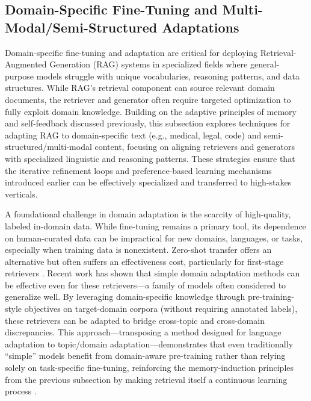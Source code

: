 \documentclass[11pt]{article}
\begin{document}
\subsection{Domain-Specific Fine-Tuning and Multi-Modal/Semi-Structured Adaptations}

Domain-specific fine-tuning and adaptation are critical for deploying Retrieval-Augmented Generation (RAG) systems in specialized fields where general-purpose models struggle with unique vocabularies, reasoning patterns, and data structures. While RAG's retrieval component can source relevant domain documents, the retriever and generator often require targeted optimization to fully exploit domain knowledge. Building on the adaptive principles of memory and self-feedback discussed previously, this subsection explores techniques for adapting RAG to domain-specific text (e.g., medical, legal, code) and semi-structured/multi-modal content, focusing on aligning retrievers and generators with specialized linguistic and reasoning patterns. These strategies ensure that the iterative refinement loops and preference-based learning mechanisms introduced earlier can be effectively specialized and transferred to high-stakes verticals.

A foundational challenge in domain adaptation is the scarcity of high-quality, labeled in-domain data. While fine-tuning remains a primary tool, its dependence on human-curated data can be impractical for new domains, languages, or tasks, especially when training data is nonexistent. Zero-shot transfer offers an alternative but often suffers an effectiveness cost, particularly for first-stage retrievers \cite{ref110}. Recent work has shown that simple domain adaptation methods can be effective even for these retrievers---a family of models often considered to generalize well. By leveraging domain-specific knowledge through pre-training-style objectives on target-domain corpora (without requiring annotated labels), these retrievers can be adapted to bridge cross-topic and cross-domain discrepancies. This approach---transposing a method designed for language adaptation to topic/domain adaptation---demonstrates that even traditionally ``simple'' models benefit from domain-aware pre-training rather than relying solely on task-specific fine-tuning, reinforcing the memory-induction principles from the previous subsection by making retrieval itself a continuous learning process \cite{ref110}.
\end{document}
